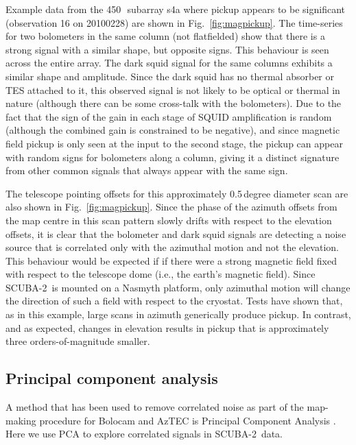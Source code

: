 \documentclass[useAMS,usenatbib,nofootinbib]{mn2e}
\newcommand{\scuba}{SCUBA-2}
\begin{document}
Example data from the 450\,\micron\ subarray s4a where pickup appears
to be significant (observation 16 on 20100228) are shown in
Fig.~\ref{fig:magpickup}. The time-series for two bolometers in the
same column (not flatfielded) show that there is a strong signal with
a similar shape, but opposite signs. This behaviour is seen across the
entire array. The dark squid signal for the same columns exhibits a
similar shape and amplitude. Since the dark squid has no thermal
absorber or TES attached to it, this observed signal is not likely to
be optical or thermal in nature (although there can be some cross-talk
with the bolometers). Due to the fact that the sign of the gain in
each stage of SQUID amplification is random (although the combined
gain is constrained to be negative), and since magnetic field pickup
is only seen at the input to the second stage, the pickup can appear
with random signs for bolometers along a column, giving it a distinct
signature from other common signals that always appear with the same
sign.

The telescope pointing offsets for this approximately 0.5\,degree
diameter scan are also shown in Fig.~\ref{fig:magpickup}. Since the
phase of the azimuth offsets from the map centre in this scan pattern
slowly drifts with respect to the elevation offsets, it is clear that
the bolometer and dark squid signals are detecting a noise source that
is correlated only with the azimuthal motion and not the
elevation. This behaviour would be expected if if there were a strong
magnetic field fixed with respect to the telescope dome (i.e., the
earth's magnetic field). Since \scuba\ is mounted on a Nasmyth
platform, only azimuthal motion will change the direction of such a
field with respect to the cryostat. Tests have shown that, as in this
example, large scans in azimuth generically produce pickup. In
contrast, and as expected, changes in elevation results in pickup that
is approximately three orders-of-magnitude smaller.

\subsection{Principal component analysis}
\label{sec:pca}

A method that has been used to remove correlated noise as part of the
map-making procedure for Bolocam and AzTEC is Principal Component
Analysis \citep[PCA,][]{laurent2005,scott2008,perera2008}. Here we use
PCA to explore correlated signals in \scuba\ data.
\end{document}
